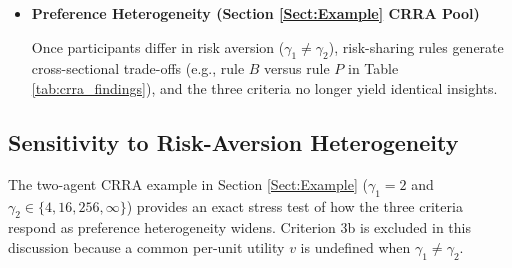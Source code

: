 \documentclass[11pt,a4paper]{article}
\theoremstyle{definition}
\theoremstyle{plain}
\theoremstyle{remark}
\newcommand{\1}{\mathbf{1}}
\begin{document}
\begin{itemize}
    \item \textbf{Preference Heterogeneity (Section \ref{Sect:Example} CRRA Pool)}
    
    Once participants differ in risk aversion ($\gamma_1 \neq \gamma_2$), risk-sharing rules generate cross-sectional trade-offs (e.g., rule $B$ versus rule $P$ in Table \ref{tab:crra_findings}), and the three criteria no longer yield identical insights.
\end{itemize}

\subsection{Sensitivity to Risk-Aversion Heterogeneity}
The two-agent CRRA example in Section \ref{Sect:Example} ($\gamma_1 = 2$ and $\gamma_2 \in \{4, 16, 256, \infty\}$) provides an exact stress test of how the three criteria respond as preference heterogeneity widens. Criterion 3b is excluded in this discussion because a common per-unit utility $v$ is undefined when $\gamma_1 \neq \gamma_2$.
\end{document}
